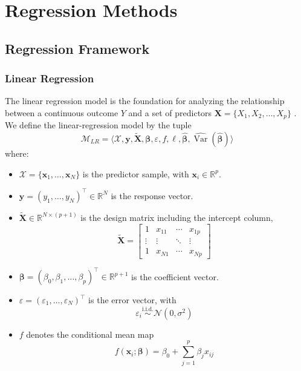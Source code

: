 \chapter{Regression Methods}
\label{chap:regression-methods}

\section{Regression Framework}
\label{sec:reg-framework}

\subsection{Linear Regression}
The linear regression model is the foundation for analyzing the relationship between a continuous outcome $Y$ and a set of predictors $\mathbf{X} = \{X_1, X_2, \dots, X_p\}$ \cite{mccullagh1989}. We define the linear-regression model by the tuple
\begin{equation}
    \mathcal{M}_{LR} = \langle \mathcal{X}, \mathbf{y}, \tilde{\mathbf{X}}, \boldsymbol{\beta}, \varepsilon, f, \ell, \hat{\boldsymbol{\beta}}, \widehat{\operatorname{Var}}(\hat{\boldsymbol{\beta}}) \rangle
\end{equation}
where:
\begin{itemize}
    \item $\mathcal{X} = \{\mathbf{x}_1,\dots,\mathbf{x}_N\}$ is the predictor sample, with $\mathbf{x}_i \in \mathbb{R}^{p}$.
    \item $\mathbf{y} = (y_1,\dots,y_N)^\top \in \mathbb{R}^{N}$ is the response vector.
    \item $\tilde{\mathbf{X}} \in \mathbb{R}^{N \times (p+1)}$ is the design matrix including the intercept column,
    \begin{equation}
        \tilde{\mathbf{X}} =
        \begin{bmatrix}
        1 & x_{11} & \cdots & x_{1p} \\
        \vdots & \vdots & \ddots & \vdots \\
        1 & x_{N1} & \cdots & x_{Np}
        \end{bmatrix}
    \end{equation}
    \item $\boldsymbol{\beta} = (\beta_0,\beta_1,\dots,\beta_p)^\top \in \mathbb{R}^{p+1}$ is the coefficient vector.
    \item $\varepsilon = (\varepsilon_1,\dots,\varepsilon_N)^\top$ is the error vector, with
    \begin{equation}
        \varepsilon_i \overset{\text{i.i.d.}}{\sim} \mathcal{N}(0,\sigma^2)
    \end{equation}
    \item $f$ denotes the conditional mean map
    \begin{equation}
        f(\mathbf{x}_i;\boldsymbol{\beta}) = \beta_0 + \sum_{j=1}^{p}\beta_j x_{ij}
    \end{equation}
\end{itemize}

